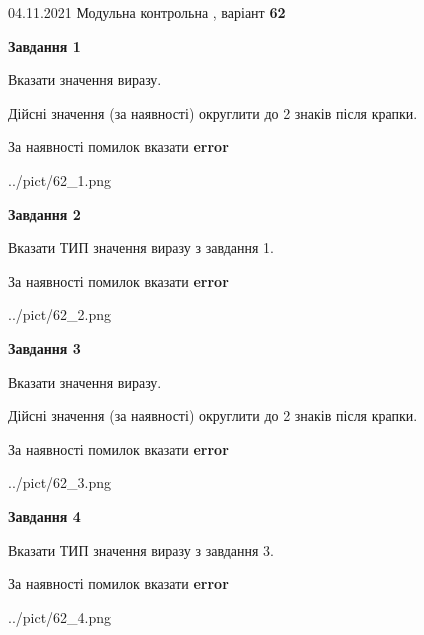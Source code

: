 \documentclass[11pt, ukrainian]{article}
\begin{document}
{04.11.2021 Модульна контрольна , варіант  \No \textbf { 62 }\par}
{
\begin {large}
{\begin {center}\textbf{Завдання 1}\end {center}}\par
Вказати значення виразу. \par
Дійсні значення (за наявності) округлити до 2 знаків після крапки. \par
За наявності помилок вказати \textbf{error}

\begin{center}
	{../pict/62_1.png}
\end{center}
\newpage

{\begin {center}\textbf{Завдання 2}\end {center}}\par
Вказати ТИП значення виразу з завдання 1. \par
За наявності помилок вказати \textbf{error}

\begin{center}
	{../pict/62_2.png}
\end{center}
\newpage

{\begin {center}\textbf{Завдання 3}\end {center}}\par
Вказати значення виразу. \par
Дійсні значення (за наявності) округлити до 2 знаків після крапки. \par
За наявності помилок вказати \textbf{error}

\begin{center}
	{../pict/62_3.png}
\end{center}
\newpage

{\begin {center}\textbf{Завдання 4}\end {center}}\par
Вказати ТИП значення виразу з завдання 3. \par
За наявності помилок вказати \textbf{error}

\begin{center}
	{../pict/62_4.png}
\end{center}
\newpage


\end{large}}
\end{document}
